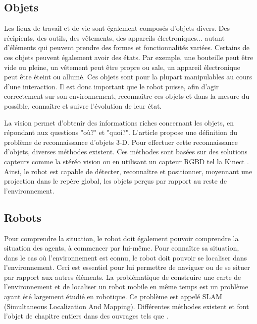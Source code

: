 \documentclass[a4paper,11pt,twoside]{StyleThese}
\begin{document}
\subsection{Objets}
Les lieux de travail et de vie sont également composés d'objets divers. Des récipients, des outils, des vêtements, des appareils électroniques... autant d'éléments qui peuvent prendre des formes et fonctionnalités variées.
Certains de ces objets peuvent également avoir des états. Par exemple, une bouteille peut être vide ou pleine, un vêtement peut être propre ou sale, un appareil électronique peut être éteint ou allumé.
Ces objets sont pour la plupart manipulables au cours d'une interaction. Il est donc important que le robot puisse, afin d'agir correctement sur son environnement, reconnaître ces objets et dans la mesure du possible, connaître et suivre l'évolution de leur état.

La vision permet d'obtenir des informations riches concernant les objets, en répondant aux questions "où?" et "quoi?". L'article \cite{Besl1985} propose une définition du problème de reconnaissance d'objets 3-D. Pour effectuer cette reconnaissance d'objets, diverses méthodes existent. Ces méthodes sont basées sur des solutions capteurs comme la stéréo vision \cite{murphy2005}
ou en utilisant un capteur RGBD tel la Kinect \cite{tang2012,han2013enhanced}.
Ainsi, le robot est capable de détecter, reconnaître et positionner, moyennant une projection dans le repère global, les objets perçus par rapport au reste de l'environnement.


\subsection{Robots}
Pour comprendre la situation, le robot doit également pouvoir comprendre la situation des agents, à commencer par lui-même. 
Pour connaître sa situation, dans le cas où l'environnement est connu, le robot doit pouvoir se localiser dans l'environnement. Ceci est essentiel pour lui permettre de naviguer ou de se situer par rapport aux autres éléments.
La problématique de construire une carte de l'environnement et de localiser un robot mobile en même temps est un problème ayant été largement étudié en robotique. Ce problème est appelé SLAM (Simultaneous Localization And Mapping). Différentes méthodes existent et font l'objet de chapitre entiers dans des ouvrages tels que \cite{siciliano2008springer,thrun2005probabilistic}.
\end{document}
